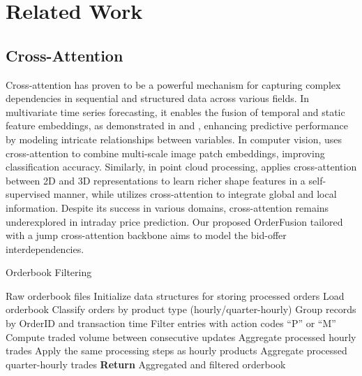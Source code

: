 \section{Related Work}
\label{sec:relatedwork}

\subsection{Cross-Attention}

Cross-attention has proven to be a powerful mechanism for capturing complex dependencies in sequential and structured data across various fields. In multivariate time series forecasting, it enables the fusion of temporal and static feature embeddings, as demonstrated in \cite{lim2021temporal} and  \cite{zhang2023crossformer}, enhancing predictive performance by modeling intricate relationships between variables. In computer vision, \cite{chen2021crossvit} uses cross-attention to combine multi-scale image patch embeddings, improving classification accuracy. Similarly, in point cloud processing, \cite{afham2022crosspoint} applies cross-attention between 2D and 3D representations to learn richer shape features in a self-supervised manner, while \cite{fei2023dctr} utilizes cross-attention to integrate global and local information. Despite its success in various domains, cross-attention remains underexplored in intraday price prediction. Our proposed OrderFusion tailored with a jump cross-attention backbone aims to model the bid-offer interdependencies. 

\begin{algorithm}[tb]
   \caption{Orderbook Filtering}
   \label{alg:orderbookfiltering}
\begin{algorithmic}
    Raw orderbook files
   \STATE Initialize data structures for storing processed orders
      \STATE Load orderbook
      \STATE Classify orders by product type (hourly/quarter-hourly)
         \STATE Group records by OrderID and transaction time
         \STATE Filter entries with action codes ``P'' or ``M'' 
         \STATE Compute traded volume between consecutive updates
         \STATE Aggregate processed hourly trades
      \ENDIF
         \STATE Apply the same processing steps as hourly products
         \STATE Aggregate processed quarter-hourly trades
      \ENDIF
   \ENDFOR
   \STATE \textbf{Return} Aggregated and filtered orderbook
\end{algorithmic}
\end{algorithm}






